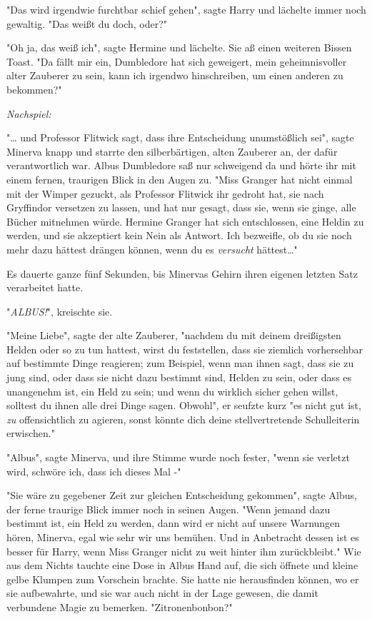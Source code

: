 {"Das wird irgendwie furchtbar schief gehen", sagte Harry und lächelte immer noch gewaltig. "Das weißt du doch, oder?"

"Oh ja, das weiß ich", sagte Hermine und lächelte. Sie aß einen weiteren Bissen Toast. "Da fällt mir ein, Dumbledore hat sich geweigert, mein geheimnisvoller alter Zauberer zu sein, kann ich irgendwo hinschreiben, um einen anderen zu bekommen?"

\emph{\emph{Nachspiel:}}

"… und Professor Flitwick sagt, dass ihre Entscheidung unumstößlich sei", sagte Minerva knapp und starrte den silberbärtigen, alten Zauberer an, der dafür verantwortlich war. Albus Dumbledore saß nur schweigend da und hörte ihr mit einem fernen, traurigen Blick in den Augen zu. "Miss Granger hat nicht einmal mit der Wimper gezuckt, als Professor Flitwick ihr gedroht hat, sie nach Gryffindor versetzen zu lassen, und hat nur gesagt, dass sie, wenn sie ginge, alle Bücher mitnehmen würde. Hermine Granger hat sich entschlossen, eine Heldin zu werden, und sie akzeptiert kein Nein als Antwort. Ich bezweifle, ob du sie noch mehr dazu hättest drängen können, wenn du es \emph{versucht} hättest…"

Es dauerte ganze fünf Sekunden, bis Minervas Gehirn ihren eigenen letzten Satz verarbeitet hatte.

"\emph{ALBUS!}", kreischte sie.

"Meine Liebe", sagte der alte Zauberer, "nachdem du mit deinem dreißigsten Helden oder so zu tun hattest, wirst du feststellen, dass sie ziemlich vorhersehbar auf bestimmte Dinge reagieren; zum Beispiel, wenn man ihnen sagt, dass sie zu jung sind, oder dass sie nicht dazu bestimmt sind, Helden zu sein, oder dass es unangenehm ist, ein Held zu sein; und wenn du wirklich sicher gehen willst, solltest du ihnen alle drei Dinge sagen. Obwohl", er seufzte kurz "es nicht gut ist, \emph{zu} offensichtlich zu agieren, sonst könnte dich deine stellvertretende Schulleiterin erwischen."

"Albus", sagte Minerva, und ihre Stimme wurde noch fester, "wenn sie verletzt wird, schwöre ich, dass ich dieses Mal -"

"Sie wäre zu gegebener Zeit zur gleichen Entscheidung gekommen", sagte Albus, der ferne traurige Blick immer noch in seinen Augen. "Wenn jemand dazu bestimmt ist, ein Held zu werden, dann wird er nicht auf unsere Warnungen hören, Minerva, egal wie sehr wir uns bemühen. Und in Anbetracht dessen ist es besser für Harry, wenn Miss Granger nicht zu weit hinter ihm zurückbleibt." Wie aus dem Nichts tauchte eine Dose in Albus Hand auf, die sich öffnete und kleine gelbe Klumpen zum Vorschein brachte. Sie hatte nie herausfinden können, wo er sie aufbewahrte, und sie war auch nicht in der Lage gewesen, die damit verbundene Magie zu bemerken. "Zitronenbonbon?"

}
